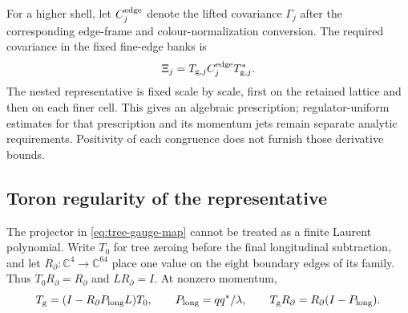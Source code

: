 \documentclass[11pt,oneside,openany]{book}
\theoremstyle{definition}
\theoremstyle{remark}
\newcommand{\C}{\mathbb C}
\begin{document}
For a higher shell, let $C_j^{\rm edge}$ denote the lifted covariance
$\Gamma_j$ after the corresponding edge-frame and colour-normalization
conversion. The required covariance in the fixed fine-edge banks is
\begin{equation}\label{eq:nested-tree-cov}
\Xi_j=T_{{\rm g},j}C_j^{\rm edge}T_{{\rm g},j}^*.
\end{equation}
The nested representative is fixed scale by scale, first on the retained
lattice and then on each finer cell. This gives an algebraic prescription;
regulator-uniform estimates for that prescription and its momentum jets
remain separate analytic requirements. Positivity of each congruence does
not furnish those derivative bounds.

\subsection{Toron regularity of the representative}
\label{sec:toron-regularity}
The projector in \cref{eq:tree-gauge-map} cannot be treated as a finite
Laurent polynomial. Write $T_0$ for tree zeroing before the final
longitudinal subtraction, and let $R_{\partial}:\C^4\to\C^{64}$ place
one value on the eight boundary edges of its family. Thus
$T_0R_{\partial}=R_{\partial}$ and $LR_{\partial}=I$. At nonzero
momentum,
\[
 T_{\rm g}=(I-R_{\partial}P_{\rm long}L)T_0,\qquad
 P_{\rm long}=qq^*/\lambda,\qquad
 T_{\rm g}R_{\partial}=R_{\partial}(I-P_{\rm long}).
\]
\end{document}
